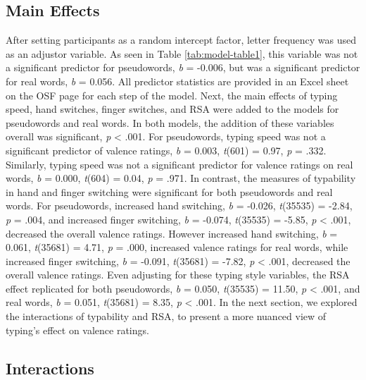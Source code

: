 \documentclass[english,man]{apa6}
\theoremstyle{definition}
\theoremstyle{definition}
\theoremstyle{definition}
\theoremstyle{remark}
\begin{document}
\subsection{Main Effects}\label{main-effects}

After setting participants as a random intercept factor, letter
frequency was used as an adjustor variable. As seen in Table
\ref{tab:model-table1}, this variable was not a significant predictor
for pseudowords, \emph{b} = -0.006, but was a significant predictor for
real words, \emph{b} = 0.056. All predictor statistics are provided in
an Excel sheet on the OSF page for each step of the model. Next, the
main effects of typing speed, hand switches, finger switches, and RSA
were added to the models for pseudowords and real words. In both models,
the addition of these variables overall was significant, \emph{p}
\textless{} .001. For pseudowords, typing speed was not a significant
predictor of valence ratings, \emph{b} = 0.003, \emph{t}(601) = 0.97,
\emph{p} = .332. Similarly, typing speed was not a significant predictor
for valence ratings on real words, \emph{b} = 0.000, \emph{t}(604) =
0.04, \emph{p} = .971. In contrast, the measures of typability in hand
and finger switching were significant for both pseudowords and real
words. For pseudowords, increased hand switching, \emph{b} = -0.026,
\emph{t}(35535) = -2.84, \emph{p} = .004, and increased finger
switching, \emph{b} = -0.074, \emph{t}(35535) = -5.85, \emph{p}
\textless{} .001, decreased the overall valence ratings. However
increased hand switching, \emph{b} = 0.061, \emph{t}(35681) = 4.71,
\emph{p} = .000, increased valence ratings for real words, while
increased finger switching, \emph{b} = -0.091, \emph{t}(35681) = -7.82,
\emph{p} \textless{} .001, decreased the overall valence ratings. Even
adjusting for these typing style variables, the RSA effect replicated
for both pseudowords, \emph{b} = 0.050, \emph{t}(35535) = 11.50,
\emph{p} \textless{} .001, and real words, \emph{b} = 0.051,
\emph{t}(35681) = 8.35, \emph{p} \textless{} .001. In the next section,
we explored the interactions of typability and RSA, to present a more
nuanced view of typing's effect on valence ratings.

\subsection{Interactions}\label{interactions}
\end{document}
